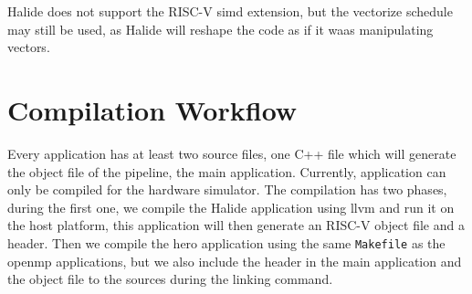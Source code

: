 	Halide does not support the RISC-V \gls{simd} extension, but the vectorize schedule may still be used, as Halide will reshape the code as if it waas manipulating vectors.



\section{Compilation Workflow}
	Every application has at least two source files, one C++ file which will generate the object file of the pipeline, the main application. 
	Currently, application can only be compiled for the hardware simulator.
	The compilation has two phases, during the first one, we compile the Halide application using \gls{llvm} and run it on the host platform, this application will then generate an RISC-V object file and a header.
	Then we compile the hero application using the same \texttt{Makefile} as the \gls{openmp} applications, but we also include the header in the main application and the object file to the sources during the linking command.



